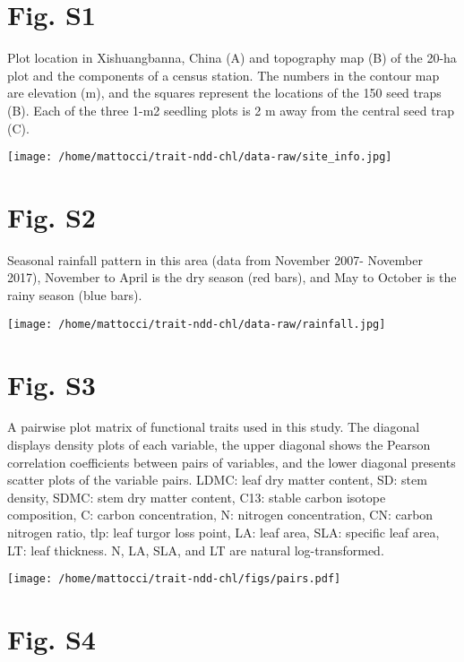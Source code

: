 \documentclass[
  12pt,
  letterpaper,
  DIV=11,
  numbers=noendperiod]{scrartcl}
\author{}
\date{}
\begin{document}
\newpage

\hypertarget{fig.-s1}{%
\section{Fig. S1}\label{fig.-s1}}

Plot location in Xishuangbanna, China (A) and topography map (B) of the
20-ha plot and the components of a census station. The numbers in the
contour map are elevation (m), and the squares represent the locations
of the 150 seed traps (B). Each of the three 1-m2 seedling plots is 2 m
away from the central seed trap (C).

\texttt{[image: /home/mattocci/trait-ndd-chl/data-raw/site\_info.jpg]}

\newpage

\hypertarget{fig.-s2}{%
\section{Fig. S2}\label{fig.-s2}}

Seasonal rainfall pattern in this area (data from November 2007-
November 2017), November to April is the dry season (red bars), and May
to October is the rainy season (blue bars).

\texttt{[image: /home/mattocci/trait-ndd-chl/data-raw/rainfall.jpg]}

\newpage

\hypertarget{fig.-s3}{%
\section{Fig. S3}\label{fig.-s3}}

A pairwise plot matrix of functional traits used in this study. The
diagonal displays density plots of each variable, the upper diagonal
shows the Pearson correlation coefficients between pairs of variables,
and the lower diagonal presents scatter plots of the variable pairs.
LDMC: leaf dry matter content, SD: stem density, SDMC: stem dry matter
content, C13: stable carbon isotope composition, C: carbon
concentration, N: nitrogen concentration, CN: carbon nitrogen ratio,
tlp: leaf turgor loss point, LA: leaf area, SLA: specific leaf area, LT:
leaf thickness. N, LA, SLA, and LT are natural log-transformed.

\texttt{[image: /home/mattocci/trait-ndd-chl/figs/pairs.pdf]}

\newpage

\hypertarget{fig.-s4}{%
\section{Fig. S4}\label{fig.-s4}}
\end{document}
